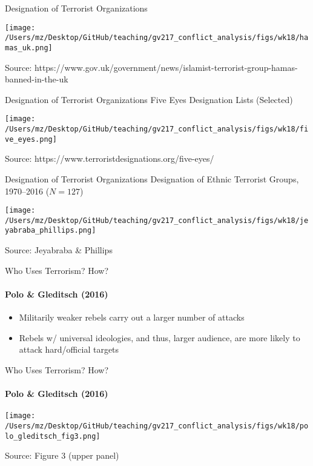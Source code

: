 \documentclass[handout]{beamer}
\begin{document}
\begin{frame}{Designation of Terrorist Organizations}
    \pause
    \begin{center}
        \texttt{[image: /Users/mz/Desktop/GitHub/teaching/gv217\_conflict\_analysis/figs/wk18/hamas\_uk.png]}
    \end{center}
    \footnotesize Source: https://www.gov.uk/government/news/islamist-terrorist-group-hamas-banned-in-the-uk
\end{frame}

\begin{frame}{Designation of Terrorist Organizations}
    \pause
    Five Eyes Designation Lists (Selected)
    \begin{center}
        \texttt{[image: /Users/mz/Desktop/GitHub/teaching/gv217\_conflict\_analysis/figs/wk18/five\_eyes.png]}
    \end{center}
    \footnotesize Source: https://www.terroristdesignations.org/five-eyes/
\end{frame}

\begin{frame}{Designation of Terrorist Organizations}
    \pause
    Designation of Ethnic Terrorist Groups, 1970--2016 (\(N = 127\))
    \begin{center}
        \texttt{[image: /Users/mz/Desktop/GitHub/teaching/gv217\_conflict\_analysis/figs/wk18/jeyabraba\_phillips.png]}
    \end{center}
    \footnotesize Source: Jeyabraba \& Phillips
\end{frame}

\begin{frame}{Who Uses Terrorism? How?}
\framesubtitle{Polo \& Gleditsch (2016)}
    \begin{itemize}
        \pause\item Militarily weaker rebels carry out a larger number of attacks
        \pause\item Rebels w/ universal ideologies, and thus, larger audience, are more likely to attack hard/official targets
\end{itemize}
\end{frame}

\begin{frame}{Who Uses Terrorism? How?}
\framesubtitle{Polo \& Gleditsch (2016)}
    \pause
    \begin{center}
        \texttt{[image: /Users/mz/Desktop/GitHub/teaching/gv217\_conflict\_analysis/figs/wk18/polo\_gleditsch\_fig3.png]}
    \end{center}
    \footnotesize Source: Figure 3 (upper panel)
\end{frame}
\end{document}
